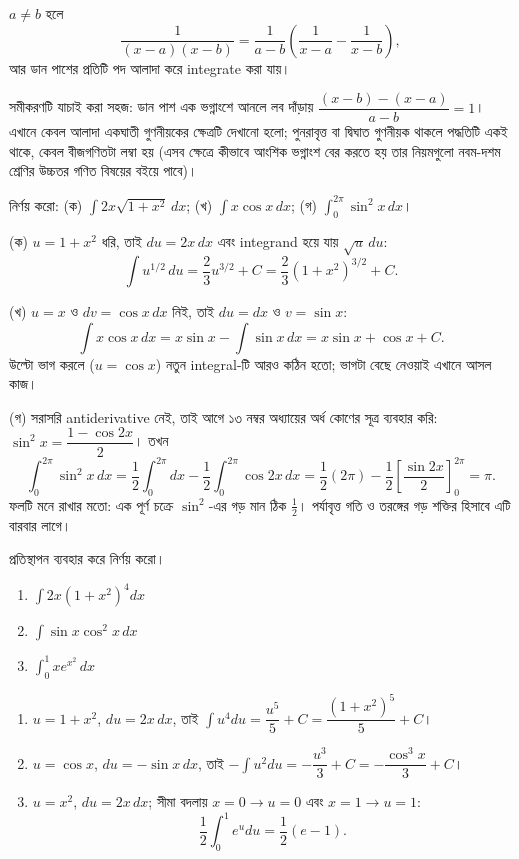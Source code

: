 \documentclass[11pt]{article}
\begin{document}
\begin{idea}[আংশিক ভগ্নাংশ]
$a \neq b$ হলে
\[
  \frac{1}{(x-a)(x-b)} = \frac{1}{a-b}\left( \frac{1}{x-a}
  - \frac{1}{x-b} \right) ,
\]
আর ডান পাশের প্রতিটি পদ আলাদা করে integrate করা যায়।
\end{idea}

সমীকরণটি যাচাই করা সহজ: ডান পাশ এক ভগ্নাংশে আনলে লব দাঁড়ায়
$\dfrac{(x-b)-(x-a)}{a-b} = 1$। এখানে কেবল আলাদা একঘাতী গুণনীয়কের ক্ষেত্রটি
দেখানো হলো; পুনরাবৃত্ত বা দ্বিঘাত গুণনীয়ক থাকলে পদ্ধতিটি একই থাকে, কেবল
বীজগণিতটা লম্বা হয় (এসব ক্ষেত্রে কীভাবে আংশিক ভগ্নাংশ বের করতে হয় তার নিয়মগুলো নবম-দশম শ্রেণির উচ্চতর গণিত বিষয়ের বইয়ে পাবে)।

\begin{example}
নির্ণয় করো: (ক) $\int 2x\sqrt{1+x^{2}}\,dx$; (খ) $\int x\cos x\,dx$;
(গ) $\int_{0}^{2\pi}\sin^{2}x\,dx$।
\end{example}

\begin{solbox}
(ক) $u = 1+x^{2}$ ধরি, তাই $du = 2x\,dx$ এবং integrand হয়ে যায়
$\sqrt{u}\,du$:
\[
  \int u^{1/2}\,du = \frac{2}{3}u^{3/2} + C
  = \frac{2}{3}\left( 1+x^{2} \right)^{3/2} + C .
\]

(খ) $u = x$ ও $dv = \cos x\,dx$ নিই, তাই $du = dx$ ও $v = \sin x$:
\[
  \int x\cos x\,dx = x\sin x - \int \sin x\,dx = x\sin x + \cos x + C .
\]
উল্টো ভাগ করলে ($u = \cos x$) নতুন integral-টি আরও কঠিন হতো; ভাগটা বেছে নেওয়াই
এখানে আসল কাজ।

(গ) সরাসরি antiderivative নেই, তাই আগে ১৩ নম্বর অধ্যায়ের অর্ধ কোণের সূত্র
ব্যবহার করি: $\sin^{2}x = \dfrac{1-\cos 2x}{2}$। তখন
\[
  \int_{0}^{2\pi}\sin^{2}x\,dx
  = \frac{1}{2}\int_{0}^{2\pi}dx - \frac{1}{2}\int_{0}^{2\pi}\cos 2x\,dx
  = \frac{1}{2}(2\pi) - \frac{1}{2}\left[ \frac{\sin 2x}{2} \right]_{0}^{2\pi}
  = \pi .
\]
ফলটি মনে রাখার মতো: এক পূর্ণ চক্রে $\sin^{2}$-এর গড় মান ঠিক $\tfrac{1}{2}$।
পর্যাবৃত্ত গতি ও তরঙ্গের গড় শক্তির হিসাবে এটি বারবার লাগে।
\end{solbox}

 প্রতিস্থাপন ব্যবহার করে নির্ণয় করো।
\begin{enumerate}
  \item $\int 2x\left( 1+x^{2} \right)^{4}dx$
  \item $\int \sin x\cos^{2}x\,dx$
  \item $\int_{0}^{1} x e^{x^{2}}\,dx$
\end{enumerate}

\begin{sol}
\begin{enumerate}
  \item $u = 1+x^{2}$, $du = 2x\,dx$, তাই
        $\int u^{4}du = \dfrac{u^{5}}{5}+C
        = \dfrac{\left( 1+x^{2} \right)^{5}}{5}+C$।
  \item $u = \cos x$, $du = -\sin x\,dx$, তাই
        $-\int u^{2}du = -\dfrac{u^{3}}{3}+C = -\dfrac{\cos^{3}x}{3}+C$।
  \item $u = x^{2}$, $du = 2x\,dx$; সীমা বদলায় $x=0 \to u=0$ এবং
        $x=1 \to u=1$:
        \[
          \frac{1}{2}\int_{0}^{1}e^{u}du = \frac{1}{2}\left( e - 1 \right) .
        \]
\end{enumerate}
\end{sol}
\end{document}
